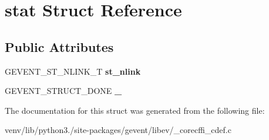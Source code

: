 \hypertarget{structstat}{}\section{stat Struct Reference}
\label{structstat}
\subsection*{Public Attributes}
\begin{DoxyCompactItemize}
\item 
\mbox{\label{structstat_a3279c7d732928622253497a80f0fbf2a}} 
G\+E\+V\+E\+N\+T\+\_\+\+S\+T\+\_\+\+N\+L\+I\+N\+K\+\_\+T {\bfseries st\+\_\+nlink}
\item 
\mbox{\label{structstat_af47dfa6c573df1391c567c1ccf07c1ae}} 
G\+E\+V\+E\+N\+T\+\_\+\+S\+T\+R\+U\+C\+T\+\_\+\+D\+O\+NE {\bfseries \+\_\+}
\end{DoxyCompactItemize}


The documentation for this struct was generated from the following file\+:\begin{DoxyCompactItemize}
\item 
venv/lib/python3./site-\/packages/gevent/libev/\+\_\+corecffi\+\_\+cdef.\+c\end{DoxyCompactItemize}
